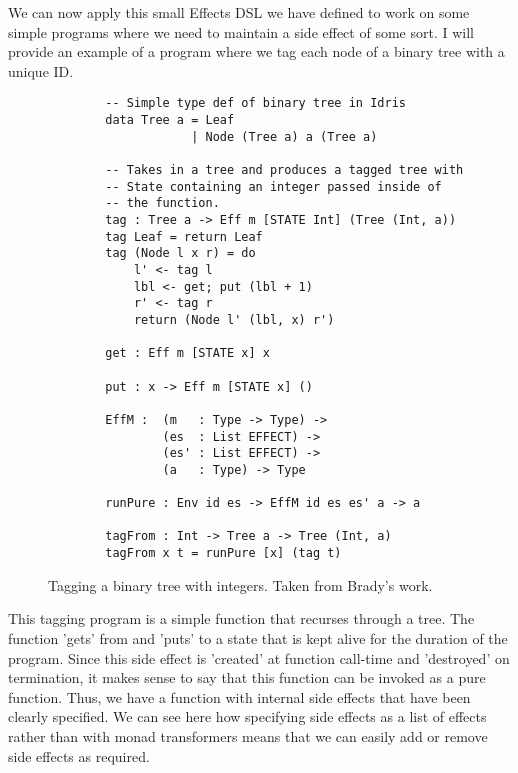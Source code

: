 We can now apply this small Effects DSL we have defined to work on some simple
programs where we need to maintain a side effect of some sort. I will provide an
example of a program where we tag each node of a binary tree with a unique ID. 

\begin{figure}[ht!!!!]
    \caption{Tagging a binary tree with integers. Taken from Brady's work.
    \protect\cite{algebraic}}
    \label{tag_def}
    \begin{lstlisting}
        -- Simple type def of binary tree in Idris
        data Tree a = Leaf
                    | Node (Tree a) a (Tree a)
        
        -- Takes in a tree and produces a tagged tree with
        -- State containing an integer passed inside of
        -- the function. 
        tag : Tree a -> Eff m [STATE Int] (Tree (Int, a))
        tag Leaf = return Leaf
        tag (Node l x r) = do
            l' <- tag l
            lbl <- get; put (lbl + 1)
            r' <- tag r
            return (Node l' (lbl, x) r')
        
        get : Eff m [STATE x] x
        
        put : x -> Eff m [STATE x] ()
        
        EffM :  (m   : Type -> Type) ->
                (es  : List EFFECT) ->
                (es' : List EFFECT) ->
                (a   : Type) -> Type
        
        runPure : Env id es -> EffM id es es' a -> a
        
        tagFrom : Int -> Tree a -> Tree (Int, a)
        tagFrom x t = runPure [x] (tag t)
    \end{lstlisting}
\end{figure}

This tagging program is a simple function that recurses through a tree. The
function 'gets' from and 'puts' to a state that is kept alive for the duration
of the program. Since this side effect is 'created' at function call-time and
'destroyed' on termination, it makes sense to say that this function can be
invoked as a pure function. Thus, we have a function with internal side effects
that have been clearly specified. We can see here how specifying side effects as
a list of effects rather than with monad transformers means that we can easily
add or remove side effects as required. 

